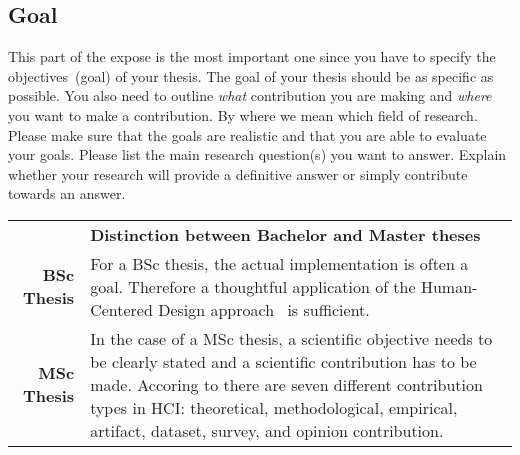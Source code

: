 \subsection{Goal}
\label{subsec:goal}
This part of the expose is the most important one since you have to specify the objectives~(goal) of your thesis. The goal of your thesis should be as specific as possible. You also need to outline \emph{what} contribution you are making and \emph{where} you want to make a contribution. By where we mean which field of research. Please make sure that the goals are realistic and that you are able to evaluate your goals. Please list the main research question(s) you want to answer. Explain whether your research will provide a
definitive answer or simply contribute towards an answer.

\begin{table}[htb]
\small
\colorbox{bamacolor}{
\centering
\begin{tabularx}{\textwidth}{@{} r Y @{}}
	&
	\textbf{Distinction between Bachelor and Master theses}\vspace{2mm}\\
    \textbf{BSc Thesis} &
    For a BSc thesis, the actual implementation is often a goal. Therefore a thoughtful application of the Human-Centered Design approach~\cite{gulliksenKeyPrinciplesUsercentred2003, dis20109241} is sufficient. \vspace{2mm}\\
	\textbf{MSc Thesis} &
	In the case of a MSc thesis, a scientific objective needs to be clearly stated and a scientific contribution has to be made. Accoring to \cite{contributionTypes2016} there are seven different contribution types in HCI: theoretical, methodological, empirical, artifact, dataset, survey, and opinion contribution.\vspace{2mm}\\
\end{tabularx}
}
\end{table}

